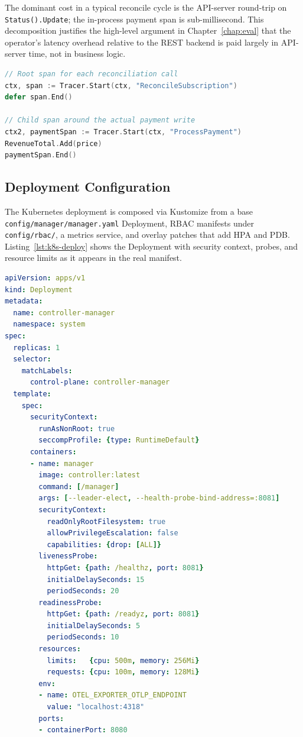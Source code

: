 The dominant cost in a typical reconcile cycle is the API-server round-trip on \texttt{Status().Update}; the in-process payment span is sub-millisecond. This decomposition justifies the high-level argument in Chapter~\ref{chap:eval} that the operator's latency overhead relative to the REST backend is paid largely in API-server time, not in business logic.

\begin{lstlisting}[language=Go, caption={Span creation inside the reconciler}, label={lst:tracing-use}]
// Root span for each reconciliation call
ctx, span := Tracer.Start(ctx, "ReconcileSubscription")
defer span.End()

// Child span around the actual payment write
ctx2, paymentSpan := Tracer.Start(ctx, "ProcessPayment")
RevenueTotal.Add(price)
paymentSpan.End()
\end{lstlisting}

\subsection{Deployment Configuration}

The Kubernetes deployment is composed via Kustomize from a base \texttt{config/manager/manager.yaml} Deployment, RBAC manifests under \texttt{config/rbac/}, a metrics service, and overlay patches that add HPA and PDB. Listing~\ref{lst:k8s-deploy} shows the Deployment with security context, probes, and resource limits as it appears in the real manifest.

\begin{lstlisting}[language=yaml, caption={Controller Deployment (extract from \texttt{config/manager/manager.yaml})}, label={lst:k8s-deploy}]
apiVersion: apps/v1
kind: Deployment
metadata:
  name: controller-manager
  namespace: system
spec:
  replicas: 1
  selector:
    matchLabels:
      control-plane: controller-manager
  template:
    spec:
      securityContext:
        runAsNonRoot: true
        seccompProfile: {type: RuntimeDefault}
      containers:
      - name: manager
        image: controller:latest
        command: [/manager]
        args: [--leader-elect, --health-probe-bind-address=:8081]
        securityContext:
          readOnlyRootFilesystem: true
          allowPrivilegeEscalation: false
          capabilities: {drop: [ALL]}
        livenessProbe:
          httpGet: {path: /healthz, port: 8081}
          initialDelaySeconds: 15
          periodSeconds: 20
        readinessProbe:
          httpGet: {path: /readyz, port: 8081}
          initialDelaySeconds: 5
          periodSeconds: 10
        resources:
          limits:   {cpu: 500m, memory: 256Mi}
          requests: {cpu: 100m, memory: 128Mi}
        env:
        - name: OTEL_EXPORTER_OTLP_ENDPOINT
          value: "localhost:4318"
        ports:
        - containerPort: 8080
\end{lstlisting}

